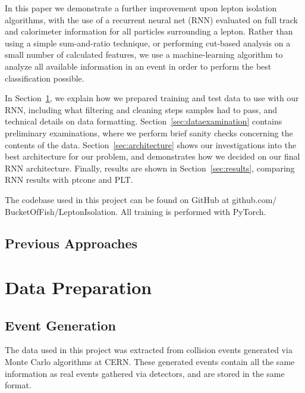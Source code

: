 
In this paper we demonstrate a further improvement upon lepton isolation algorithms, with the use of a recurrent neural net (RNN) evaluated on full track and calorimeter information for all particles surrounding a lepton. Rather than using a simple sum-and-ratio technique, or performing cut-based analysis on a small number of calculated features, we use a machine-learning algorithm to analyze all available information in an event in order to perform the best classification possible.


In Section~\ref{sec:dataprep}, we explain how we prepared training and test data to use with our RNN, including what filtering and cleaning steps samples had to pass, and technical details on data formatting. Section~\ref{sec:dataexamination} contains preliminary examinations, where we perform brief sanity checks concerning the contents of the data. Section~\ref{sec:architecture} shows our investigations into the best architecture for our problem, and demonstrates how we decided on our final RNN architecture. Finally, results are shown in Section~\ref{sec:results}, comparing RNN results with ptcone and PLT.

The codebase used in this project can be found on GitHub at github.com/ BucketOfFish/LeptonIsolation. All training is performed with PyTorch.

\subsection{Previous Approaches}

\section{Data Preparation}\label{sec:dataprep}

\subsection{Event Generation}

The data used in this project was extracted from collision events generated via Monte Carlo algorithms at CERN. These generated events contain all the same information as real events gathered via detectors, and are stored in the same format.



